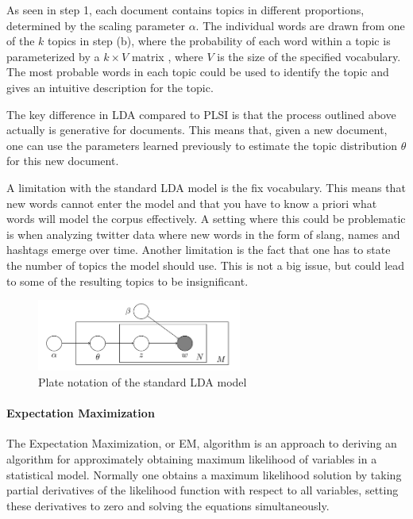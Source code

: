 \documentclass[12pt]{report}
\begin{document}
As seen in step 1, each document contains topics in different proportions, determined 
by the scaling parameter $\alpha$. The individual words are drawn from one of the $k$ 
topics in step (b), where the probability of each word within a topic is parameterized 
by a $k \times V$ matrix , where $V$ is the size of the specified vocabulary. The 
most probable words in each topic could be used to identify the topic and gives an 
intuitive description for the topic.
 
The key difference in LDA compared to PLSI is that the process outlined above actually 
is generative for documents. This means that, given a new document, one can use the 
parameters learned previously to estimate the topic distribution $\theta$ for this 
new document.
 
A limitation with the standard LDA model is the fix vocabulary. This means that new 
words cannot enter the model and that you have to know a priori what words will model 
the corpus effectively. A setting where this could be problematic is when analyzing 
twitter data where new words in the form of slang, names and hashtags emerge over 
time. Another limitation is the fact that one has to state the number of topics 
the model should use. This is not a big issue, but could lead to some of the 
resulting topics to be insignificant.

\begin{figure}
\centering
\includegraphics[width=0.6\textwidth]{LDA_standard_model.png}
\caption{Plate notation of the standard LDA model}
\end{figure}


\paragraph{Expectation Maximization}

The Expectation Maximization, or EM, algorithm is an approach to deriving an algorithm 
for approximately obtaining maximum likelihood of variables in a statistical model. 
Normally one obtains a maximum likelihood solution by taking partial derivatives of 
the likelihood function with respect to all variables, setting these derivatives to 
zero and solving the equations simultaneously.
\end{document}
